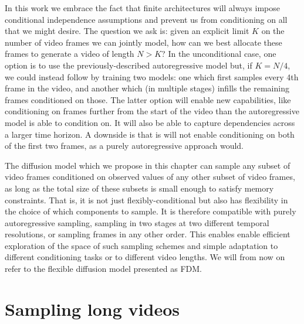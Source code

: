 In this work we embrace the fact that finite architectures will always impose conditional independence assumptions and prevent us from conditioning on all that we might desire. The question we ask is: given an explicit limit $K$ on the number of video frames we can jointly model, how can we best allocate these frames to generate a video of length $N > K$? In the unconditional case, one option is to use the previously-described autoregressive model but, if $K=N/4$, we could instead follow \citet{ho2022video} by training two models: one which first samples every 4th frame in the video, and another which (in multiple stages) infills the remaining frames conditioned on those. The latter option will enable new capabilities, like conditioning on frames further from the start of the video than the autoregressive model is able to condition on. It will also be able to capture dependencies across a larger time horizon. A downside is that is will not enable conditioning on both of the first two frames, as a purely autoregressive approach would.

The diffusion model which we propose in this chapter can sample any subset of video frames conditioned on observed values of any other subset of video frames, as long as the total size of these subsets is small enough to satisfy memory constraints. That is, it is not just flexibly-conditional but also has flexibility in the choice of which components to sample. It is therefore compatible with purely autoregressive sampling, sampling in two stages at two different temporal resolutions, or sampling frames in any other order. This enables enable efficient exploration of the space of such sampling schemes and simple adaptation to different conditioning tasks or to different video lengths. We will from now on refer to the flexible diffusion model presented as FDM.


\section{Sampling long videos}


